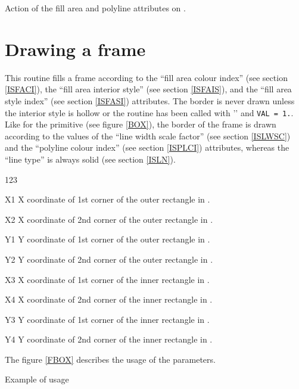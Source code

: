 \begin{Fighere}
\begin{center}\mbox{}\end{center}
\caption{Action of the fill area and polyline attributes on 
\protect{}.}
\label{BOX}
\end{Fighere}
 
\vfill\newpage
{}
\section{Drawing a frame}
\Action
This routine fills a frame according to the ``fill area colour index''
(see section \ref{ISFACI}), the ``fill area interior style'' (see section
\ref{ISFAIS}), and the ``fill area style index'' (see section \ref{ISFASI})
attributes. The border is never drawn unless the interior
style is hollow or the routine  has been called with ''
and {\tt VAL = 1.}. Like for the  primitive (see figure \ref{BOX}),
the border of the frame is drawn according to the values of the ``line width
scale factor'' (see section \ref{ISLWSC}) and the ``polyline colour index''
(see section \ref{ISPLCI}) attributes, whereas the ``line type'' is always solid
(see section \ref{ISLN}).
\Pdesc
\begin{DLtt}{123}
\item[X1] X coordinate of 1st corner of the outer rectangle in \wc.
\item[X2] X coordinate of 2nd corner of the outer rectangle in \wc.
\item[Y1] Y coordinate of 1st corner of the outer rectangle in \wc.
\item[Y2] Y coordinate of 2nd corner of the outer rectangle in \wc.
\item[X3] X coordinate of 1st corner of the inner rectangle in \wc.
\item[X4] X coordinate of 2nd corner of the inner rectangle in \wc.
\item[Y3] Y coordinate of 1st corner of the inner rectangle in \wc.
\item[Y4] Y coordinate of 2nd corner of the inner rectangle in \wc.
\end{DLtt}
The figure \ref{FBOX} describes the usage of the  parameters.

\begin{Fighere}
\begin{center}\mbox{}\end{center}
\caption{Example of \protect{} usage}
\label{FBOX}
\end{Fighere}
 

